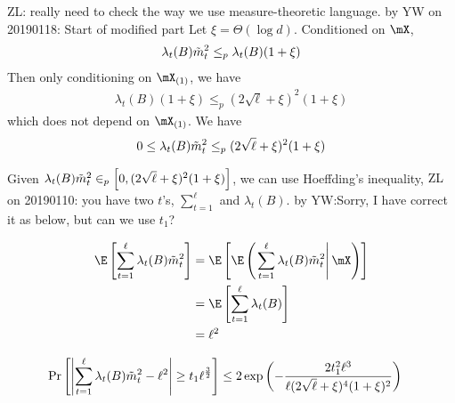 
{\color{red} ZL: really need to check the way we use measure-theoretic language.}
{\color{red}by YW on 20190118: Start of modified part}
Let $\xi = \Theta(\log d)$. Conditioned on $\mX$,
\begin{equation}
\begin{split}
    \lambda_{t}(B)\Tilde{m}^2_t 
    \leq_p \lambda_{t}(B) (1+\xi)
\end{split}
\end{equation}
Then only conditioning on $\mX_{(1)}$, we have
\begin{equation}
\begin{split}
    \lambda_{t}(B) (1+\xi)
    \leq_p (2\sqrt{\ell}+\xi)^2 (1+\xi)
\end{split}
\end{equation}
which does not depend on $\mX_{(1)}$. We have
\begin{equation}
\begin{split}
    0 \leq \lambda_{t}(B)\Tilde{m}^2_t
    \leq_p (2\sqrt{\ell}+\xi)^2 (1+\xi)
\end{split}
\end{equation}

Given $\lambda_{t}(B)\Tilde{m}^2_t \in_p \left[0,  (2\sqrt{\ell}+\xi)^2 (1+\xi) \right]$, we can use Hoeffding's inequality,
{\color{red} ZL on 20190110: you have two $t$'s, 
$\sum_{t = 1}^{\ell}$ and $\lambda_t(B)$.}
{\color{blue}by YW:Sorry, I have correct it as below, but can we use $t_1$?}

\begin{equation}
\begin{split}
    \E\left[\sum^{\ell}_{t = 1}\lambda_{t}(B)\Tilde{m}^2_t \right] 
    & = \E\left[\E\left(\left.\sum^{\ell}_{t = 1}\lambda_{t}(B)\Tilde{m}^2_t \right|\mX \right) \right]       \\ 
    &=\E\left[\sum^{\ell}_{t = 1}\lambda_{t}(B) \right]      \\ 
    &= \ell^2
\end{split}
\end{equation}

\begin{equation}
\begin{split}
    \Pr\left[ \left|\sum^{\ell}_{t = 1}\lambda_{t}(B)\Tilde{m}^2_t - \ell^2 \right| \geq t_1 \ell^{\frac{3}{2}} \right]  
    &\leq   2\exp \left(-\frac{2t_1^2\ell^3}{\ell(2\sqrt{\ell}+\xi)^4 (1+\xi)^2 } \right)     
\end{split}
\end{equation}

